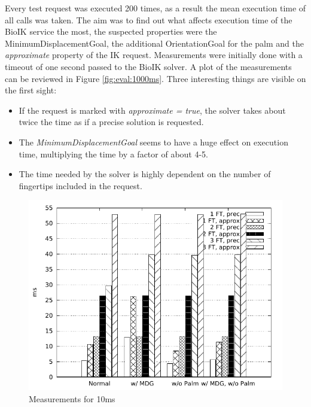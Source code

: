 Every test request was executed 200 times, as a result the mean execution time of all calls was taken. The aim was to find out what affects execution time of the BioIK service the most, the suspected properties were the MinimumDisplacementGoal, the additional OrientationGoal for the palm and the \textit{approximate} property of the IK request. Measurements were initially done with a timeout of one second passed to the BioIK solver. A plot of the measurements can be reviewed in Figure \ref{fig:eval:1000ms}. Three interesting things are visible on the first sight:
\begin{itemize}
	\item If the request is marked with \textit{approximate = true}, the solver takes about twice the time as if a precise solution is requested.
	\item The \textit{MinimumDisplacementGoal} seems to have a huge effect on execution time, multiplying the time by a factor of about 4-5.
	\item The time needed by the solver is highly dependent on the number of fingertips included in the request. 
\end{itemize}

\begin{figure}
	\caption{\label{fig:eval:10ms}Measurements for 10ms}
	\begin{center}
		\includegraphics{assets/chpt_eval/10ms.pdf}
	\end{center}
\end{figure}

